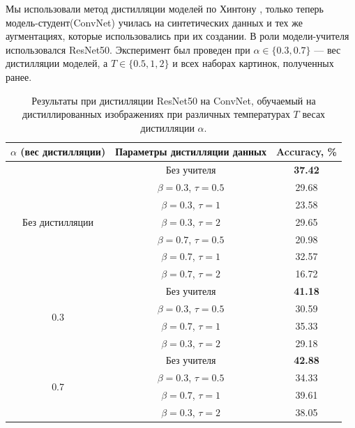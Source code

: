 \documentclass[12pt]{article}
\begin{document}
Мы использовали метод дистилляции моделей по Хинтону \cite{hinton2015distilling}, только теперь модель-студент(ConvNet) училась на синтетических данных и тех же аугментациях, которые использовались при их создании. В роли модели-учителя использовался ResNet50. Эксперимент был проведен при $\alpha \in \{0.3, 0.7\}$ --- вес дистилляции моделей, а $T\in \{0.5, 1, 2\}$ и всех наборах картинок, полученных ранее. 

\begin{table}[]
\begin{center}
\begin{tabular}{c|c|c}
    \hline
    \multirow{1}{*}{$\alpha$ (вес дистилляции)}& Параметры дистилляции данных & Accuracy, \%\\
    \hline
    \multirow{7}{*}{Без дистилляции}& Без учителя & \textbf{37.42}\\
                        & $\beta = 0.3$, $\tau=0.5$ & 29.68\\
                        & $\beta = 0.3$, $\tau=1$ & 23.58\\
                        & $\beta = 0.3$, $\tau=2$ & 29.65\\
                        & $\beta = 0.7$, $\tau=0.5$ & 20.98\\
                        & $\beta = 0.7$, $\tau=1$ & 32.57\\
                        & $\beta = 0.7$, $\tau=2$ & 16.72\\
                        
    \hline
    \multirow{4}{*}{0.3}& Без учителя & \textbf{41.18}\\
                        & $\beta = 0.3$, $\tau=0.5$ & 30.59\\
                        & $\beta = 0.7$, $\tau=1$ & 35.33\\
                        & $\beta = 0.3$, $\tau=2$ & 29.18\\
    \hline
    \multirow{4}{*}{0.7}& Без учителя & \textbf{42.88}\\
                        & $\beta = 0.3$, $\tau=0.5$ & 34.33\\
                        & $\beta = 0.7$, $\tau=1$ & 39.61\\
                        & $\beta = 0.3$, $\tau=2$ & 38.05\\
    \hline
\end{tabular}
\end{center}
\caption{Результаты при дистилляции ResNet50 на ConvNet, обучаемый на дистиллированных изображениях при различных температурах $T$ весах дистилляции $\alpha$.}
\label{tab:table_4}
\end{table}
\end{document}
